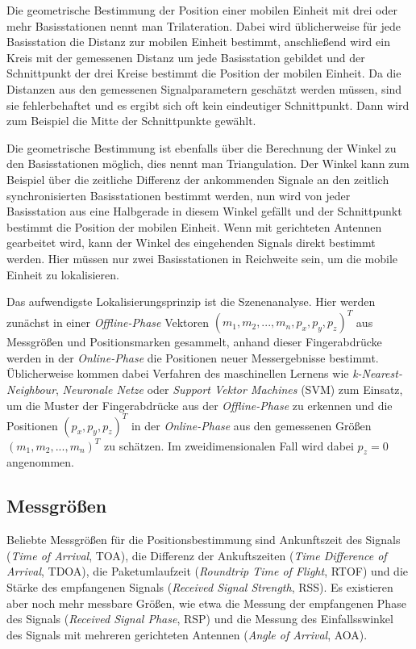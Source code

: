 Die geometrische Bestimmung der Position einer mobilen Einheit mit drei oder mehr Basisstationen nennt man Trilateration. Dabei wird üblicherweise für jede Basisstation die Distanz zur mobilen Einheit bestimmt, anschließend wird ein Kreis mit der gemessenen Distanz um jede Basisstation gebildet und der Schnittpunkt der drei Kreise bestimmt die Position der mobilen Einheit. Da die Distanzen aus den gemessenen Signalparametern geschätzt werden müssen, sind sie fehlerbehaftet und es ergibt sich oft kein eindeutiger Schnittpunkt. 
Dann wird zum Beispiel die Mitte der Schnittpunkte gewählt. 

Die geometrische Bestimmung ist ebenfalls über die Berechnung der Winkel zu den Basisstationen möglich, dies nennt man Triangulation. Der Winkel kann zum Beispiel über die zeitliche Differenz der ankommenden Signale an den zeitlich synchronisierten Basisstationen bestimmt werden, nun wird von jeder Basisstation aus eine Halbgerade in diesem Winkel gefällt und der Schnittpunkt bestimmt die Position der mobilen Einheit. 
Wenn mit gerichteten Antennen gearbeitet wird, kann der Winkel des eingehenden Signals direkt bestimmt werden.
Hier müssen nur zwei Basisstationen in Reichweite sein, um die mobile Einheit zu lokalisieren. 

Das aufwendigste Lokalisierungsprinzip ist die Szenenanalyse. Hier werden zunächst in einer \emph{Offline-Phase} Vektoren $(m_1,m_2,...,m_n,p_x,p_y,p_z)^T$ aus Messgrößen und Positionsmarken gesammelt, anhand dieser Fingerabdrücke werden in der \emph{Online-Phase} die Positionen neuer Messergebnisse bestimmt. Üblicherweise kommen dabei Verfahren des maschinellen Lernens wie \emph{k-Nearest-Neighbour}, \emph{Neuronale Netze} oder \emph{Support Vektor Machines} (SVM) zum Einsatz, um die Muster der Fingerabdrücke aus der \emph{Offline-Phase} zu erkennen und die Positionen $(p_x,p_y,p_z)^T$ in der \emph{Online-Phase} aus den gemessenen Größen $(m_1,m_2,...,m_n)^T$ zu schätzen. Im zweidimensionalen Fall wird dabei $p_z = 0$ angenommen.

\subsection{Messgrößen}
Beliebte Messgrößen für die Positionsbestimmung sind Ankunftszeit des Signals (\emph{Time of Arrival}, TOA), die Differenz der Ankuftszeiten (\emph{Time Difference of Arrival}, TDOA), die Paketumlaufzeit (\emph{Roundtrip Time of Flight}, RTOF) und die Stärke des empfangenen Signals (\emph{Received Signal Strength}, RSS). Es existieren aber noch mehr messbare Größen, wie etwa die Messung der empfangenen Phase des Signals (\emph{Received Signal Phase}, RSP) und die Messung des Einfallsswinkel des Signals mit mehreren gerichteten Antennen (\emph{Angle of Arrival}, AOA). 

